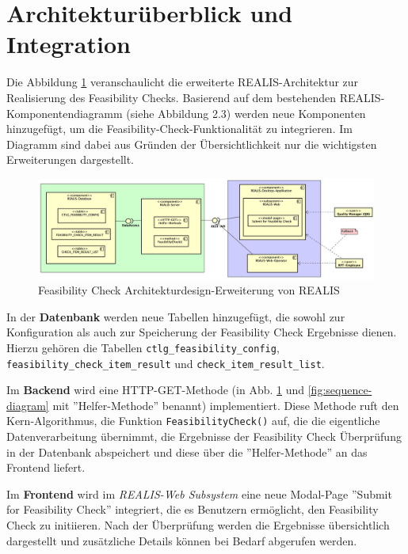 \section{Architekturüberblick und Integration}

Die Abbildung \ref{fig:feasibility-check-komponentendiagramm} veranschaulicht die erweiterte REALIS-Architektur zur Realisierung des Feasibility Checks. Basierend auf dem bestehenden REALIS-Komponenten\-diagramm (siehe Abbildung 2.3) werden neue Komponenten hinzugefügt, um die Feasibility-Check-Funktionalität zu integrieren. Im Diagramm sind dabei aus Gründen der Übersichtlichkeit nur die wichtigsten Erweiterungen dargestellt.

\begin{figure}[!htbp]
    \centering
    \includegraphics[width=1\textwidth]{bilder/REALIS-Komponentendiagramm-mit-Erweiterungen2.png}
    \caption{Feasibility Check Architekturdesign-Erweiterung von \gls{REALIS}}
    \label{fig:feasibility-check-komponentendiagramm}
\end{figure}



In der \textbf{Datenbank} werden neue Tabellen hinzugefügt, die sowohl zur Konfiguration als auch zur Speicherung der Feasibility Check Ergebnisse dienen. Hierzu gehören die Tabellen \texttt{ctlg\_feasibility\_config}, \texttt{feasibility\_check\_item\_result} und \texttt{check\_item\_\-result\_\-list}.

Im \textbf{Backend} wird eine HTTP-GET-Methode (in Abb. \ref{fig:feasibility-check-komponentendiagramm} und \ref{fig:sequence-diagram} mit ''Helfer-Methode'' benannt) implementiert. Diese Methode ruft den Kern-Algorithmus, die Funktion \texttt{FeasibilityCheck()} auf, die die eigentliche Datenverarbeitung übernimmt, die Ergebnisse der Feasibility Check Überprüfung in der Datenbank abspeichert und diese über die ''Helfer-Methode'' an das Frontend liefert.

Im \textbf{Frontend} wird im \textit{REALIS-Web Subsystem} eine neue Modal-Page ''Submit for Feasibility Check'' integriert, die es Benutzern ermöglicht, den Feasibility Check zu initiieren. Nach der Überprüfung werden die Ergebnisse übersichtlich dargestellt und zusätzliche Details können bei Bedarf abgerufen werden. 

